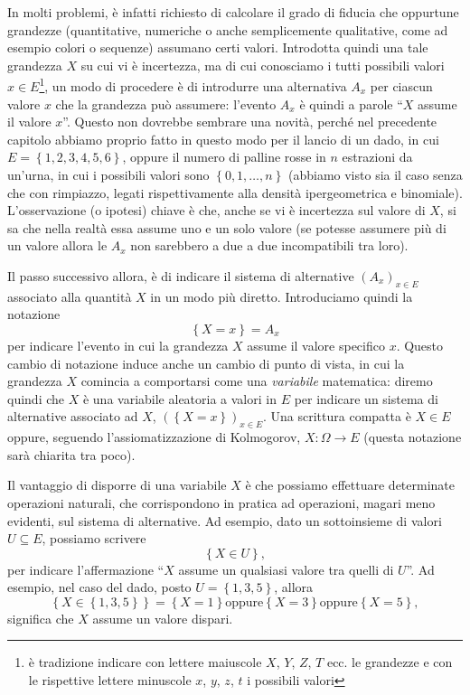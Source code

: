 \documentclass[
  italian,
  letterpaper,
]{book}
\newcommand{\bra}[1]{\left( #1 \right)}
\newcommand{\cur}[1]{\left\{ #1 \right\}}
\theoremstyle{definition}
\theoremstyle{remark}
\begin{document}
In molti problemi, è infatti richiesto di calcolare il grado di fiducia
che oppurtune grandezze (quantitative, numeriche o anche semplicemente
qualitative, come ad esempio colori o sequenze) assumano certi valori.
Introdotta quindi una tale grandezza \(X\) su cui vi è incertezza, ma di
cui conosciamo i tutti possibili valori \(x \in E\)\footnote{è
  tradizione indicare con lettere maiuscole \(X\), \(Y\), \(Z\), \(T\)
  ecc. le grandezze e con le rispettive lettere minuscole \(x\), \(y\),
  \(z\), \(t\) i possibili valori}, un modo di procedere è di introdurre
una alternativa \(A_x\) per ciascun valore \(x\) che la grandezza può
assumere: l'evento \(A_x\) è quindi a parole ``\(X\) assume il valore
\(x\)''. Questo non dovrebbe sembrare una novità, perché nel precedente
capitolo abbiamo proprio fatto in questo modo per il lancio di un dado,
in cui \(E = \cur{1, 2,3,4,5,6}\), oppure il numero di palline rosse in
\(n\) estrazioni da un'urna, in cui i possibili valori sono
\(\cur{0,1, \ldots, n}\) (abbiamo visto sia il caso senza che con
rimpiazzo, legati rispettivamente alla densità ipergeometrica e
binomiale). L'osservazione (o ipotesi) chiave è che, anche se vi è
incertezza sul valore di \(X\), si sa che nella realtà essa assume uno e
un solo valore (se potesse assumere più di un valore allora le \(A_x\)
non sarebbero a due a due incompatibili tra loro).

Il passo successivo allora, è di indicare il sistema di alternative
\((A_x)_{x \in E}\) associato alla quantità \(X\) in un modo più
diretto. Introduciamo quindi la notazione \[ \cur{ X = x} = A_x\] per
indicare l'evento in cui la grandezza \(X\) assume il valore specifico
\(x\). Questo cambio di notazione induce anche un cambio di punto di
vista, in cui la grandezza \(X\) comincia a comportarsi come una
\emph{variabile} matematica: diremo quindi che \(X\) è una variabile
aleatoria a valori in \(E\) per indicare un sistema di alternative
associato ad \(X\), \(\bra{ \cur{X = x} }_{x \in E}\). Una scrittura
compatta è \(X \in E\) oppure, seguendo l'assiomatizzazione di
Kolmogorov, \(X: \Omega \to E\) (questa notazione sarà chiarita tra
poco).

Il vantaggio di disporre di una variabile \(X\) è che possiamo
effettuare determinate operazioni naturali, che corrispondono in pratica
ad operazioni, magari meno evidenti, sul sistema di alternative. Ad
esempio, dato un sottoinsieme di valori \(U \subseteq E\), possiamo
scrivere \[ \cur{ X \in U}, \] per indicare l'affermazione ``\(X\)
assume un qualsiasi valore tra quelli di \(U\)''. Ad esempio, nel caso
del dado, posto \(U = \cur{1,3,5}\), allora
\[ \cur{X \in \cur{1,3,5}}  = \cur{X =1} \text{oppure} \cur{X=3}  \text{oppure} \cur{X =5},\]
significa che \(X\) assume un valore dispari.
\end{document}
